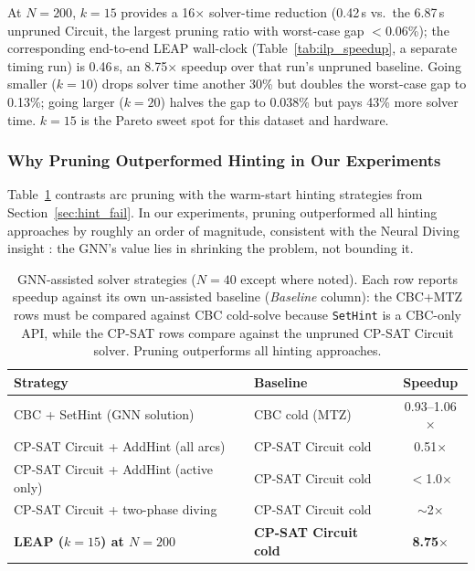 \documentclass[review,times]{elsarticle}
\begin{document}
At $N{=}200$, $k{=}15$ provides a 16$\times$ solver-time reduction (0.42\,s vs.\ the 6.87\,s unpruned Circuit, the largest pruning ratio with worst-case gap $<$0.06\%); the corresponding end-to-end LEAP wall-clock (Table~\ref{tab:ilp_speedup}, a separate timing run) is 0.46\,s, an 8.75$\times$ speedup over that run's unpruned baseline. Going smaller ($k{=}10$) drops solver time another 30\% but doubles the worst-case gap to 0.13\%; going larger ($k{=}20$) halves the gap to 0.038\% but pays 43\% more solver time. $k{=}15$ is the Pareto sweet spot for this dataset and hardware.

\subsubsection{Why Pruning Outperformed Hinting in Our Experiments}

Table~\ref{tab:hint_comparison} contrasts arc pruning with the warm-start hinting strategies from Section~\ref{sec:hint_fail}. In our experiments, pruning outperformed all hinting approaches by roughly an order of magnitude, consistent with the Neural Diving insight \cite{nair2021neural}: the GNN's value lies in shrinking the problem, not bounding it.

\begin{table}[htbp]
\caption{GNN-assisted solver strategies ($N{=}40$ except where noted). Each row reports speedup against its own un-assisted baseline (\textit{Baseline} column): the CBC+MTZ rows must be compared against CBC cold-solve because \texttt{SetHint} is a CBC-only API, while the CP-SAT rows compare against the unpruned CP-SAT Circuit solver. Pruning outperforms all hinting approaches.}
\label{tab:hint_comparison}
\centering
\begin{tabular}{@{}llc@{}}
\toprule
\textbf{Strategy} & \textbf{Baseline} & \textbf{Speedup} \\
\midrule
CBC + SetHint (GNN solution)            & CBC cold (MTZ)        & 0.93--1.06$\times$ \\
CP-SAT Circuit + AddHint (all arcs)     & CP-SAT Circuit cold   & 0.51$\times$ \\
CP-SAT Circuit + AddHint (active only)  & CP-SAT Circuit cold   & $<$1.0$\times$ \\
CP-SAT Circuit + two-phase diving       & CP-SAT Circuit cold   & $\sim$2$\times$ \\
\textbf{LEAP ($k{=}15$) at $N{=}200$}   & \textbf{CP-SAT Circuit cold} & \textbf{8.75$\times$} \\
\bottomrule
\end{tabular}
\end{table}
\end{document}
